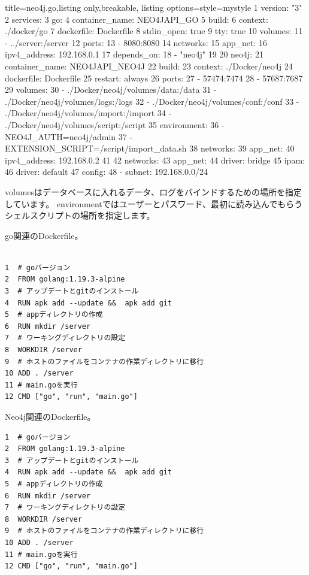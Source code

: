 \begin{tcblisting}{title={neo4j.go},listing only,breakable, listing options={style=mystyle}}
  1 version: "3"
  2 services:
  3   go:
  4     container_name: NEO4JAPI_GO
  5     build:
  6       context: ./docker/go
  7       dockerfile: Dockerfile
  8     stdin_open: true
  9     tty: true
  10    volumes:
  11      - ../server:/server
  12    ports:
  13      - 8080:8080
  14    networks:
  15      app_net:
  16        ipv4_address: 192.168.0.1
  17    depends_on:
  18      - "neo4j"
  19
  20  neo4j:
  21    container_name: NEO4JAPI_NEO4J
  22    build:
  23      context: ./Docker/neo4j
  24      dockerfile: Dockerfile
  25    restart: always
  26    ports:
  27      - 57474:7474
  28      - 57687:7687
  29    volumes:
  30      - ./Docker/neo4j/volumes/data:/data
  31      - ./Docker/neo4j/volumes/logs:/logs
  32      - ./Docker/neo4j/volumes/conf:/conf
  33      - ./Docker/neo4j/volumes/import:/import
  34      - ./Docker/neo4j/volumes/script:/script
  35    environment:
  36      - NEO4J_AUTH=neo4j/admin
  37      - EXTENSION_SCRIPT=/script/import_data.sh
  38    networks:
  39      app_net:
  40        ipv4_address: 192.168.0.2
  41
  42 networks:
  43  app_net:
  44    driver: bridge
  45    ipam:
  46      driver: default
  47      config:
  48        - subnet: 192.168.0.0/24
\end{tcblisting}


volumesはデータベースに入れるデータ、ログをバインドするための場所を指定しています。
environmentではユーザーとパスワード、最初に読み込んでもらうシェルスクリプトの場所を指定します。

go関連のDockerfile。
\begin{tcolorbox}[title=Dockerfile]
\begin{verbatim}

1  # goバージョン
2  FROM golang:1.19.3-alpine
3  # アップデートとgitのインストール
4  RUN apk add --update &&  apk add git
5  # appディレクトリの作成
6  RUN mkdir /server
7  # ワーキングディレクトリの設定
8  WORKDIR /server
9  # ホストのファイルをコンテナの作業ディレクトリに移行
10 ADD . /server
11 # main.goを実行
12 CMD ["go", "run", "main.go"]
\end{verbatim}
\end{tcolorbox}

Neo4j関連のDockerfile。
\begin{tcolorbox}[title=Dockerfile]
\begin{verbatim}
1  # goバージョン
2  FROM golang:1.19.3-alpine
3  # アップデートとgitのインストール
4  RUN apk add --update &&  apk add git
5  # appディレクトリの作成
6  RUN mkdir /server
7  # ワーキングディレクトリの設定
8  WORKDIR /server
9  # ホストのファイルをコンテナの作業ディレクトリに移行
10 ADD . /server
11 # main.goを実行
12 CMD ["go", "run", "main.go"]
\end{verbatim}
\end{tcolorbox}

